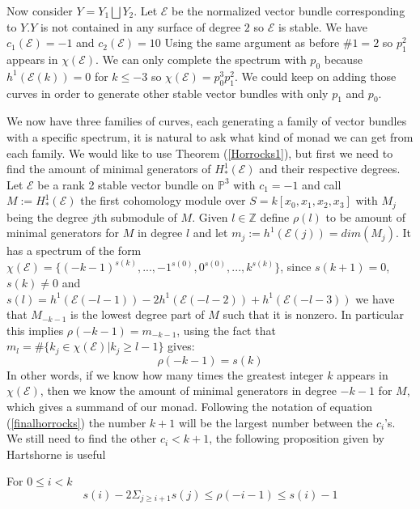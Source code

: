 \documentclass[
	oldfontcommands,
	sumario=abnt-6027-2012,
	12pt,			%
	openright,		%
	oneside,		%
	a4paper,		%
	english,		%
	brazil			%
	]{imecc-unicamp}
\begin{document}
\begin{example}
Now consider $Y=Y_1 \bigsqcup Y_2$. Let $\mathcal{E}$ be the normalized vector bundle corresponding to $Y$.$Y$ is not contained in any surface of degree $2$ so $\mathcal{E}$ is stable. We have $c_1(\mathcal{E})=-1$ and $c_2(\mathcal{E})=10$ Using the same argument as before $\# 1 = 2$ so $p_1^2$ appears in $\chi(\mathcal{E})$. We can only complete the spectrum with $p_0$ because $h^1(\mathcal{E}(k))=0$ for $k \leq -3$ so $\chi(\mathcal{E})=p_0^3p_1^2$. We could keep on adding those curves in order to generate other stable vector bundles with only $p_1$ and $p_0$.
\end{example}
We now have three families of curves, each generating a family of vector bundles with a specific spectrum, it is natural to ask what kind of monad we can get from each family. We would like to use Theorem (\ref{Horrocks1}), but first we need to find the amount of minimal generators of $H^1_*(\mathcal{E})$ and their respective degrees.\\
Let $\mathcal{E}$ be a rank 2 stable vector bundle on $\mathbb{P}^3$ with $c_1=-1$ and call $M:=H^1_*(\mathcal{E})$ the first cohomology module over $S=k[x_0,x_1,x_2,x_3]$ with $M_j$ being the degree $j$th submodule of $M$. Given $l\in \mathbb{Z}$ define $\rho(l)$ to be amount of minimal generators for $M$ in degree $l$ and let $m_j:=h^1(\mathcal{E}(j))=dim(M_j)$. It has a spectrum of the form $\chi(\mathcal{E})= \{(-k-1)^{s(k)},...,-1^{s(0)},0^{s(0)},...,k^{s(k)} \}$, since $s(k+1) = 0$, $s(k) \not=0$ and $s(l) =h^1(\mathcal{E}(-l-1))-2h^1(\mathcal{E}(-l-2))+h^1(\mathcal{E}(-l-3)) $ we have that $M_{-k-1}$ is the lowest degree part of $M$ such that it is nonzero. In particular this implies $\rho(-k-1)=m_{-k-1}$, using the fact that $m_l=\# \{k_j \in \chi(\mathcal{E}) | k_j \geq l-1 \}$ gives:
\begin{equation}\label{maxmod}
\rho(-k-1)=s(k)
\end{equation}
In other words, if we know how many times the greatest integer $k$ appears in $\chi(\mathcal{E})$, then we know the amount of minimal generators in degree $-k-1$ for $M$, which gives a summand of our monad. Following the notation of equation (\ref{finalhorrocks}) the number $k+1$ will be the largest number between the $c_i$'s.\\
We still need to find the other $c_i < k+1$, the following proposition given by Hartshorne is useful
\begin{proposition}\cite[Hartshorne \& Rao, p.796]{hartshorne1991}\label{desigualdade}
For $0 \leq i < k$
\begin{equation}
s(i)-2\Sigma_{j\geq i+1}s(j) \leq \rho(-i-1) \leq s(i)-1
\end{equation}
\end{proposition}
\end{document}
